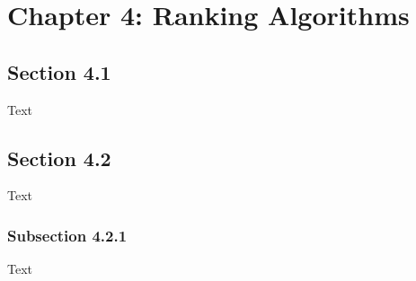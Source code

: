 \chapter{Chapter 4: Ranking Algorithms}


\section{Section 4.1}
Text \\




\section{Section 4.2}
Text\\




\subsection{Subsection 4.2.1}
Text\\
